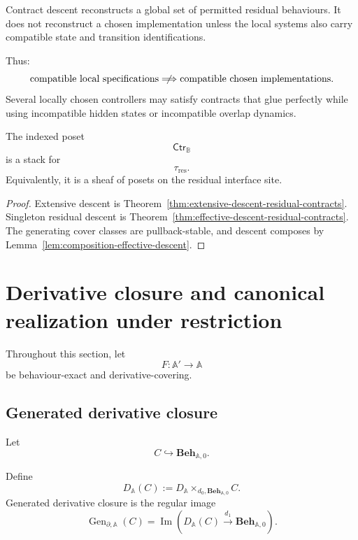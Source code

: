 \begin{remark}
\label{rem:specifications-versus-implementations}
Contract descent reconstructs a global set of permitted residual behaviours.
It does not reconstruct a chosen implementation unless the local systems also
carry compatible state and transition identifications.

Thus:
\[
    \text{compatible local specifications}
    \centernot\Longrightarrow
    \text{compatible chosen implementations}.
\]
Several locally chosen controllers may satisfy contracts that glue perfectly
while using incompatible hidden states or incompatible overlap dynamics.
\end{remark}

\begin{corollary}
\label{cor:stack-residual-contracts}
The indexed poset
\[
    \mathsf{Ctr}_{\mathbb B}
\]
is a stack for
\[
    \tau_{\mathrm{res}}.
\]
Equivalently, it is a sheaf of posets on the residual interface site.
\end{corollary}

\begin{proof}
Extensive descent is
Theorem~\ref{thm:extensive-descent-residual-contracts}.
Singleton residual descent is
Theorem~\ref{thm:effective-descent-residual-contracts}.
The generating cover classes are pullback-stable, and descent composes by
Lemma~\ref{lem:composition-effective-descent}.
\end{proof}

\section{Derivative closure and canonical realization under restriction}
\label{sec:derivative-closure-canonical-realization-restriction}

Throughout this section, let
\[
    F:\mathbb A'\to\mathbb A
\]
be behaviour-exact and derivative-covering.

\subsection{Generated derivative closure}
\label{subsec:generated-derivative-closure-restriction}

Let
\[
    C\hookrightarrow\mathbf{Beh}_{\mathbb A,0}.
\]

Define
\[
    D_{\mathbb A}(C)
    :=
    D_{\mathbb A}
    \times_{d_0,\mathbf{Beh}_{\mathbb A,0}}
    C.
\]
Generated derivative closure is the regular image
\[
    \operatorname{Gen}_{\partial,\mathbb A}(C)
    =
    \operatorname{Im}
    \left(
        D_{\mathbb A}(C)
        \xrightarrow{d_1}
        \mathbf{Beh}_{\mathbb A,0}
    \right).
\]

